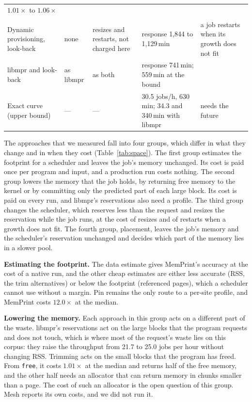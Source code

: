 \documentclass[11pt]{article}
\newcommand{\memprint}{MemPrint}
\newcommand{\tabref}[1]{Table~\ref{#1}}
\begin{document}
\begin{table}[!htbp]
\begin{tabular}{L{3.2cm}L{2.3cm}L{2.2cm}L{4.9cm}L{3.5cm}}
$1.01\times$ to $1.06\times$ \\
\addlinespace
{} \\
Dynamic provisioning, look-back & none & resizes and restarts, not charged here & response 1{,}844 to 1{,}129\,min & a
job restarts when its growth does not fit \\
libmpr and look-back & as libmpr & as both & response 741\,min; 559\,min at the bound & \\
Exact curve (upper bound) & --- & --- & 30.5 jobs/h, 630\,min; 34.3 and 340\,min with libmpr & needs the future \\
\bottomrule
\end{tabular}
\end{table}

The approaches that we measured fall into four groups, which differ in what they change and in when they cost
(\tabref{tab:space}). The first group estimates the footprint for a scheduler and leaves the job's memory unchanged.
Its cost is paid once per program and input, and a production run costs nothing. The second group lowers the memory
that the job holds, by returning free memory to the kernel or by committing only the predicted part of each large
block. Its cost is paid on every run, and libmpr's reservations also need a profile. The third group changes the
scheduler, which reserves less than the request and resizes the reservation while the job runs, at the cost of
resizes and of restarts when a growth does not fit. The fourth group, placement, leaves the job's memory and the
scheduler's reservation unchanged and decides which part of the memory lies in a slower pool.

\textbf{Estimating the footprint.} The data estimate gives \memprint{}'s accuracy at the cost of a native run, and
the other cheap estimates are either less accurate (RSS, the trim alternatives) or below the footprint (referenced
pages), which a scheduler cannot use without a margin. Pin remains the only route to a per-site profile, and
\memprint{} costs $12.0\times$ at the median.

\textbf{Lowering the memory.} Each approach in this group acts on a different part of the waste. libmpr's
reservations act on the large blocks that the program requests and does not touch, which is where most of the
request's waste lies on this corpus: they raise the throughput from 21.7 to 25.0 jobs per hour without changing RSS.
Trimming acts on the small blocks that the program has freed. From \texttt{free}, it costs $1.01\times$ at the median
and returns half of the free memory, and the other half needs an allocator that can return memory in chunks smaller
than a page. The cost of such an allocator is the open question of this group. Mesh reports its own costs, and we did
not run it.
\end{document}
